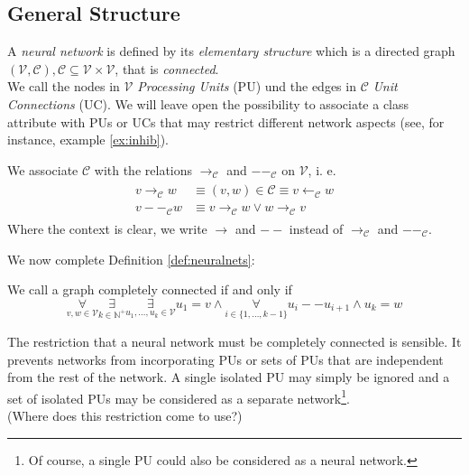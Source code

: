 \documentclass[a4paper,11pt]{article}
\begin{document}
\subsection{General Structure}
\begin{Def}\label{def:neuralnets}
A \emph{neural network} is defined by its \emph{elementary structure} which is a directed graph $(\mathcal{V},\mathcal{C}),\mathcal{C}\subseteq\mathcal{V}\times\mathcal{V}$, that is \emph{connected}.\\
We call the nodes in $\mathcal{V}$ \emph{Processing Units} (PU) und the edges in $\mathcal{C}$ \emph{Unit Connections} (UC). We will leave open the possibility to associate a class attribute with PUs or UCs that may restrict different network aspects (see, for instance, example \ref{ex:inhib}).
\end{Def}
\begin{Not}
We associate $\mathcal{C}$ with the relations $\to_{\mathcal{C}}$ and $--_{\mathcal{C}}$ on $\mathcal{V}$, i. e.
\begin{align}
\begin{split}
v\to_{\mathcal{C}} w&\equiv(v,w)\in\mathcal{C}\equiv v\leftarrow_{\mathcal{C}} w\\
v--_{\mathcal{C}}w&\equiv v\to_{\mathcal{C}} w\vee w\to_{\mathcal{C}} v
\end{split}
\end{align}
Where the context is clear, we write $\to$ and $--$ instead of $\to_{\mathcal{C}}$ and $--_{\mathcal{C}}$.
\end{Not}
We now complete Definition \ref{def:neuralnets}:
\begin{Def}\label{def:connected}
We call a graph completely connected if and only if 
\begin{equation}
\underset{v,w\in\mathcal{V}}{\forall}\underset{k\in\mathbb{N}^+}{\exists}\underset{u_1,\dotsc,u_k\in\mathcal{V}}{\exists}u_1=v\wedge\underset{i\in\{1,\dotsc,k-1\}}{\forall}u_i--u_{i+1}\wedge u_k=w
\end{equation}
\end{Def}
\begin{Abs}
The restriction that a neural network must be completely connected is sensible. It prevents networks from incorporating PUs or sets of PUs that are independent from the rest of the network. A single isolated PU may simply be ignored and a set of isolated PUs may be considered as a separate network\footnote{
Of course, a single PU could also be considered as a neural network.}.\\
(Where does this restriction come to use?)
\end{Abs}
\end{document}
